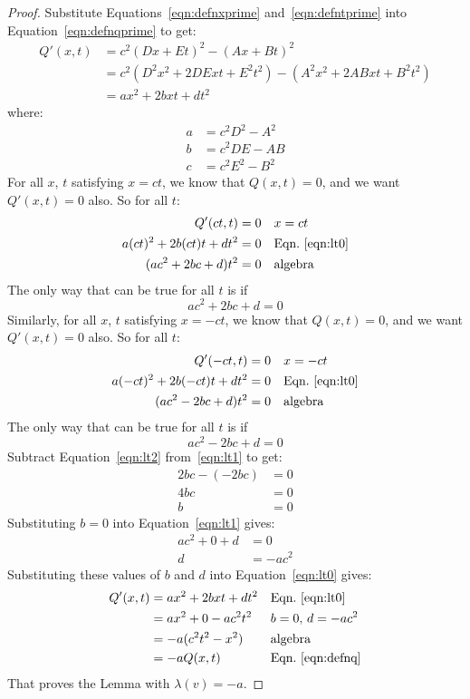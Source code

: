 \documentclass[a4paper]{article}
\theoremstyle{plain}
\theoremstyle{definition}
\begin{document}
\begin{proof}
Substitute Equations~\eqref{eqn:defnxprime} and~\eqref{eqn:defntprime}
into Equation~\eqref{eqn:defnqprime} to get:
\begin{align}
Q'(x,t)
  & = c^2 (Dx + Et)^2 - (Ax+Bt)^2 \nonumber \\
  & = c^2 (D^2x^2 + 2DExt + E^2t^2) - (A^2x^2 + 2ABxt + B^2t^2) \nonumber \\
  & = ax^2 + 2bxt + dt^2 \label{eqn:lt0}
\end{align}
where:
\begin{align*}
  a & = c^2 D^2 - A^2 \\
  b & = c^2 DE - AB \\
  c & = c^2 E^2 - B^2
\end{align*}
For all $x$, $t$ satisfying $x=ct$, we know that $Q(x,t)=0$,
and we want $Q'(x,t)=0$ also.
So for all $t$:
\begin{align*}
Q'(ct,t) & = 0 & & \text{$x=ct$} \\
a(ct)^2 + 2b(ct)t + dt^2 & = 0 & & \text{Eqn.~\eqref{eqn:lt0}} \\
(ac^2 + 2bc + d) t^2 & = 0 & & \text{algebra}
\end{align*}
The only way that can be true for all $t$ is if
\begin{equation}
ac^2 + 2bc + d = 0 \label{eqn:lt1}
\end{equation}
Similarly, for all $x$, $t$ satisfying $x=-ct$, we know that $Q(x,t)=0$,
and we want $Q'(x,t)=0$ also.
So for all $t$:
\begin{align*}
Q'(-ct,t) & = 0 & & \text{$x=-ct$} \\
a(-ct)^2 + 2b(-ct)t + dt^2 & = 0 & & \text{Eqn.~\eqref{eqn:lt0}} \\
(ac^2 - 2bc + d) t^2 & = 0 & & \text{algebra}
\end{align*}
The only way that can be true for all $t$ is if
\begin{equation}
ac^2 - 2bc + d = 0 \label{eqn:lt2}
\end{equation}
Subtract Equation~\eqref{eqn:lt2} from~\eqref{eqn:lt1} to get:
\begin{align*}
2bc - (-2bc) & = 0 \\
4bc & = 0 \\
b & = 0
\end{align*}
Substituting $b=0$ into Equation~\eqref{eqn:lt1} gives:
\begin{align*}
ac^2 + 0 + d & = 0 \\
d & = -ac^2
\end{align*}
Substituting these values of $b$ and $d$ into Equation~\eqref{eqn:lt0}
gives:
\begin{align*}
Q'(x,t)
  & = ax^2 + 2bxt + dt^2 & & \text{Eqn.~\eqref{eqn:lt0}} \\
  & = ax^2 + 0 - ac^2t^2 & & \text{$b=0$, $d=-ac^2$} \\
  & = -a(c^2t^2 - x^2) & & \text{algebra} \\
  & = -a Q(x,t) & & \text{Eqn.~\eqref{eqn:defnq}}
\end{align*}
That proves the Lemma with $\lambda(v) = -a$.
\end{proof}
\end{document}
